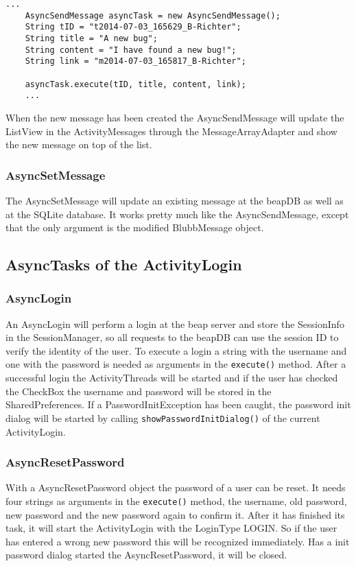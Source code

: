 \documentclass[12pt,a4paper,oneside]{report}
\newcommand{\beapDB}{beapDB}
\newcommand{\beapServer}{beap server}
\newcommand{\code}[1]{\lstinline{#1}}
\begin{document}
\begin{lstlisting}[caption=AsyncSendMessage example, label=lst:AsyncSendMsg]
	...
	AsyncSendMessage asyncTask = new AsyncSendMessage();
	String tID = "t2014-07-03_165629_B-Richter";
	String title = "A new bug";
	String content = "I have found a new bug!";
	String link = "m2014-07-03_165817_B-Richter";
	
	asyncTask.execute(tID, title, content, link);	
	...
\end{lstlisting}

When the new message has been created the AsyncSendMessage will update the ListView in the ActivityMessages through the MessageArrayAdapter and show the new message on top of the list.

\subsubsection{AsyncSetMessage}
The AsyncSetMessage will update an existing message at the \beapDB{} as well as at the SQLite database. It works pretty much like the AsyncSendMessage, except that the only argument is the modified BlubbMessage object. 

\subsection{AsyncTasks of the ActivityLogin}\label{subsec:AsyncLogin}
\subsubsection{AsyncLogin}
An AsyncLogin will perform a login at the \beapServer{} and store the SessionInfo in the SessionManager, so all requests to the \beapDB{} can use the session ID to verify the identity of the user. To execute a login a string with the username and one with the password is needed as arguments in the \code{execute()} method.
After a successful login the ActivityThreads will be started and if the user has checked the CheckBox the username and password will be stored in the SharedPreferences. If a PasswordInitException has been caught, the password init dialog will be started by calling \code{showPasswordInitDialog()} of the current ActivityLogin. 

\subsubsection{AsyncResetPassword}
With a AsyncResetPassword object the password of a user can be reset. It needs four strings as arguments in the \code{execute()} method, the username, old password, new password and the new password again to confirm it. After it has finished its task, it will start the ActivityLogin with the LoginType LOGIN. So if the user has entered a wrong new password this will be recognized immediately. Has a init password dialog started the AsyncResetPassword, it will be closed.
\end{document}
